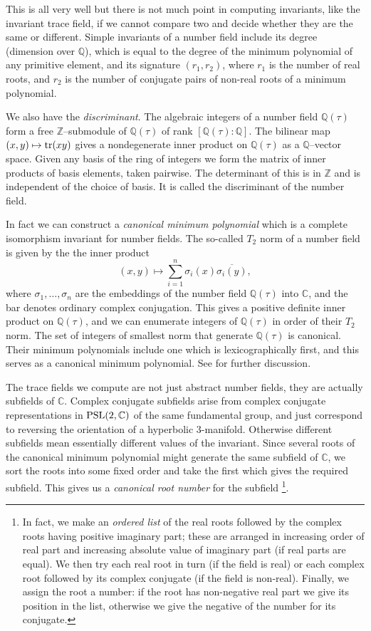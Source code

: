 \documentclass[a4paper]{amsart}
\def\Z{{\mathbb Z}}
\def\Q{{\mathbb Q}}
\def\C{{\mathbb C}}
\def\psl2c{\mbox{\rm PSL}(2,\C)}
\def\tr{\mbox{\rm tr}}
\theoremstyle{definition}
\begin{document}
This is all very well but there is not much point in computing
invariants, like the invariant trace field, if we cannot compare two
and decide whether they are the same or different. Simple invariants
of a number field include its degree (dimension over $\Q$), which is
equal to the degree of the minimum polynomial of any primitive
element, and its signature $(r_1,r_2)$, where  $r_1$ is the number of 
real roots, and $r_2$ is the number of conjugate
pairs of non-real roots of a minimum polynomial. 

We also have the {\em discriminant}. The algebraic integers of a
number field $\Q(\tau)$ form a free $\Z$--submodule of $\Q(\tau)$
of rank $[\Q(\tau):\Q]$.  The bilinear map $(x,y)\mapsto \tr(xy)$
gives a nondegenerate inner product on $\Q(\tau)$ as a $\Q$--vector
space. Given any basis of the ring of integers we form the matrix of
inner products of basis elements, taken pairwise. The determinant of
this is in $\Z$ and is independent of the choice of basis. It is
called the discriminant of the number field. 

In fact we can construct a {\em canonical minimum polynomial} 
which is a complete isomorphism invariant for number fields. 
The so-called $T_2$ norm of
a number field is given by the
the inner product
$$(x,y) \mapsto  \sum_{i=1}^n \sigma_i(x)\overline{\sigma_i(y)},$$
where  $\sigma_1 , \ldots, \sigma_n$ are the embeddings of
the number field $\Q(\tau)$ into $\C$, and the bar denotes ordinary 
complex conjugation. 
This gives a positive definite inner product
on $\Q(\tau)$, and we can enumerate integers of $\Q(\tau)$ in order of
their $T_2$ norm. The set of integers of smallest norm 
that generate $\Q(\tau)$
is canonical. Their minimum polynomials include one which
is lexicographically first, and this serves as a canonical
minimum polynomial.  See \cite{cohen} for further discussion.

The trace fields we compute are not just abstract number fields, they
are actually subfields of $\C$. Complex conjugate
subfields arise from complex conjugate representations in
$\psl2c$ of the same fundamental group, and just correspond to reversing the
orientation of a hyperbolic 3-manifold.  Otherwise
different subfields mean essentially different values of the invariant. 
Since several roots of the
canonical minimum polynomial might generate the same subfield of $\C$,
we sort the roots into some fixed order and take the first which gives
the required subfield. This gives us a {\em canonical root number}
for the subfield%
\footnote{
\label{rootnumbers}
In fact, we make an {\em ordered list} of the real roots followed by the
complex roots having positive imaginary part; these are arranged in 
increasing order of real part and increasing absolute value 
of imaginary part (if real parts are equal).
We then try each real root in turn (if the field is real) or 
each complex root followed by its complex conjugate (if the field is non-real).
Finally, we assign the root a number: if the root has non-negative real
part we give its position in the list, 
otherwise we give the negative of the number for its conjugate.}.
\end{document}
